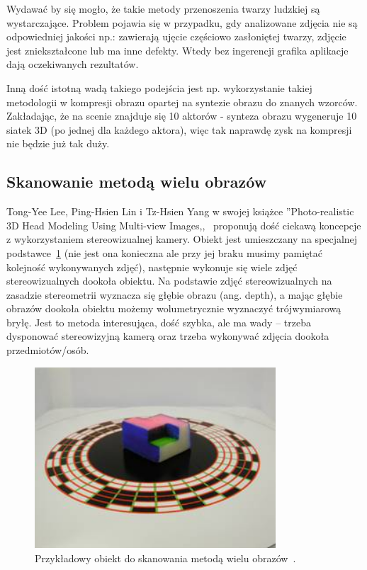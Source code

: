 Wydawać by się mogło, że takie metody przenoszenia twarzy ludzkiej są
wystarczające. Problem pojawia się w przypadku, gdy analizowane zdjęcia nie są
odpowiedniej jakości np.: zawierają ujęcie częściowo zasłoniętej twarzy, zdjęcie
jest zniekształcone lub ma inne defekty. Wtedy bez ingerencji grafika
aplikacje dają oczekiwanych rezultatów.

Inną dość istotną wadą takiego podejścia jest np. wykorzystanie takiej
metodologii w kompresji obrazu opartej na syntezie obrazu do znanych wzorców.
Zakładając, że na scenie znajduje się 10 aktorów - synteza obrazu wygeneruje 10
siatek 3D (po jednej dla każdego aktora), więc tak naprawdę zysk na kompresji
nie będzie już tak duży.

\subsection{Skanowanie metodą wielu obrazów}
Tong-Yee Lee, Ping-Hsien Lin i Tz-Hsien Yang w swojej książce ''Photo-realistic
3D Head Modeling Using Multi-view Images,,~\cite{multiview} proponują dość
ciekawą koncepcje z wykorzystaniem stereowizualnej kamery. Obiekt jest
umieszczany na specjalnej podstawce~\ref{multiview} (nie jest ona konieczna ale
przy jej braku musimy pamiętać kolejność wykonywanych zdjęć), następnie wykonuje
się wiele zdjęć stereowizualnych dookoła obiektu. Na podstawie zdjęć
stereowizualnych na zasadzie stereometrii wyznacza się głębie obrazu (ang.
depth), a mając głębie obrazów dookoła obiektu możemy wolumetrycznie wyznaczyć
trójwymiarową bryłę. Jest to metoda interesująca, dość szybka, ale ma wady --
trzeba dysponować stereowizyjną kamerą oraz trzeba wykonywać zdjęcia dookoła
przedmiotów/osób.

\begin{figure}[h]
  \centering
  \includegraphics[width=9cm]{images/multi-view2.jpg}
  \caption{Przykładowy obiekt do skanowania metodą wielu
  obrazów~\cite{multiview}.}
  \label{multiview}
\end{figure}

